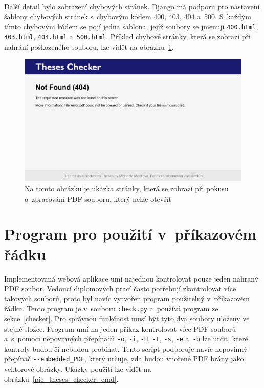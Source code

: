Další detail bylo zobrazení chybových stránek. Django má podporu pro nastavení
šablony chybových stránek s~chybovým kódem 400, 403, 404 a~500. S~každým tímto
chybovým kódem se pojí jedna šablona, jejíž soubory se jmenují \texttt{400.html},
\texttt{403.html}, \texttt{404.html} a~\texttt{500.html}. Příklad chybové
stránky, která se zobrazí při nahrání poškozeného souboru, lze vidět na
obrázku~\ref{pic_theses_checker_error}.

\begin{figure}[H]
    \centering
    \includegraphics[width=\linewidth]{obrazky-figures/screenshot-error.png}
    \caption{
        Na tomto obrázku je ukázka stránky, která se zobrazí při pokusu o~zpracování
        PDF souboru, který nelze otevřít
    }
    \label{pic_theses_checker_error}
\end{figure}



\section{Program pro použití v~příkazovém řádku}

Implementovaná webová aplikace umí najednou kontrolovat pouze jeden nahraný PDF
soubor. Vedoucí diplomových prací často potřebují zkontrolovat více takových
souborů, proto byl navíc vytvořen program použitelný v~příkazovém řádku. 
Tento program je v~souboru \texttt{check.py} a~používá program ze
sekce~\ref{checker}. Pro správnou funkčnost musí být tyto dva soubory uloženy ve
stejné složce. Program umí na jeden příkaz kontrolovat více PDF souborů
a~s~pomocí nepovinných přepínačů \texttt{-o}, \texttt{-i}, \texttt{-H}, 
\texttt{-t}, \texttt{-s}, \texttt{-e} a~\texttt{-b} lze určit, které kontroly
budou či nebudou probíhat. Tento script podporuje navíc nepovinný přepínač
\texttt{-{-}embedded\_PDF}, který určuje, zda budou vnořené PDF brány jako
vektorové obrázky. Ukázky použití lze vidět na 
obrázku~\ref{pic_theses_checker_cmd}.

